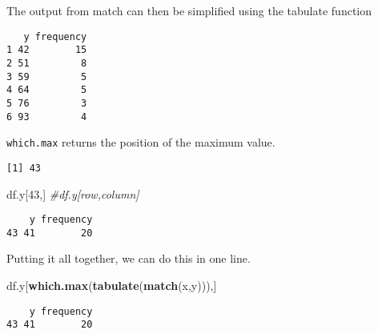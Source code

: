 \documentclass[12pt,]{article}
\newenvironment{Shaded}{\begin{snugshade}}{\end{snugshade}}
\newcommand{\KeywordTok}[1]{\textcolor[rgb]{0.13,0.29,0.53}{\textbf{#1}}}
\newcommand{\DecValTok}[1]{\textcolor[rgb]{0.00,0.00,0.81}{#1}}
\newcommand{\StringTok}[1]{\textcolor[rgb]{0.31,0.60,0.02}{#1}}
\newcommand{\CommentTok}[1]{\textcolor[rgb]{0.56,0.35,0.01}{\textit{#1}}}
\newcommand{\OperatorTok}[1]{\textcolor[rgb]{0.81,0.36,0.00}{\textbf{#1}}}
\newcommand{\NormalTok}[1]{#1}
\theoremstyle{definition}
\theoremstyle{definition}
\theoremstyle{definition}
\theoremstyle{remark}
\begin{document}
The output from match can then be simplified using the tabulate function

\begin{Shaded}
\end{Shaded}

\begin{verbatim}
   y frequency
1 42        15
2 51         8
3 59         5
4 64         5
5 76         3
6 93         4
\end{verbatim}

\texttt{which.max} returns the position of the maximum value.

\begin{Shaded}
\end{Shaded}

\begin{verbatim}
[1] 43
\end{verbatim}

\begin{Shaded}
\begin{Highlighting}[]
\NormalTok{df.y[}\DecValTok{43}\NormalTok{,]  }\CommentTok{#df.y[row,column]}
\end{Highlighting}
\end{Shaded}

\begin{verbatim}
    y frequency
43 41        20
\end{verbatim}

Putting it all together, we can do this in one line.

\begin{Shaded}
\begin{Highlighting}[]
\NormalTok{df.y[}\KeywordTok{which.max}\NormalTok{(}\KeywordTok{tabulate}\NormalTok{(}\KeywordTok{match}\NormalTok{(x,y))),] }
\end{Highlighting}
\end{Shaded}

\begin{verbatim}
    y frequency
43 41        20
\end{verbatim}
\end{document}
